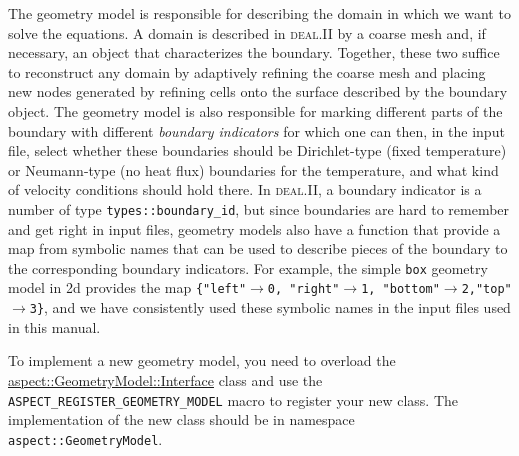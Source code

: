 \documentclass{article}
\newcommand{\dealii}{{\textsc{deal.II}}}
\begin{document}
The geometry model is responsible for describing the domain in which we want
to solve the equations. A domain is described in \dealii{} by a coarse mesh
and, if necessary, an object that characterizes the boundary. Together, these
two suffice to reconstruct any domain by adaptively refining the coarse mesh
and placing new nodes generated by refining cells onto the surface described
by the boundary object. The geometry model is also responsible for marking
different parts of the boundary with different \textit{boundary indicators}
for which one can then, in the input file, select whether these boundaries
should be Dirichlet-type
(fixed temperature) or Neumann-type (no heat flux) boundaries for the
temperature, and what kind of velocity conditions should hold there. In
\dealii{}, a boundary indicator is a number of type
\texttt{types::boundary\_id}, but since boundaries are hard to remember and
get right in input files, geometry models also have a function that provide a
map from symbolic names that can be used to describe pieces of the boundary to
the corresponding boundary indicators. For example, the simple \texttt{box}
geometry model in 2d provides the map
\texttt{\{"left"$\rightarrow$0, "right"$\rightarrow$1,
"bottom"$\rightarrow$2,"top"$\rightarrow$3\}}, and we have consistently used
these symbolic names in the input files used in this manual.

To implement a new geometry model, you need to overload the
\href{doc/doxygen/classaspect_1_1GeometryModel_1_1Interface.html}{aspect::GeometryModel::Interface}
class and use
the \texttt{ASPECT\_REGISTER\_GEOMETRY\_MODEL} macro to register your new
class. The implementation of the new class should be in namespace
\texttt{aspect::GeometryModel}.
\end{document}
